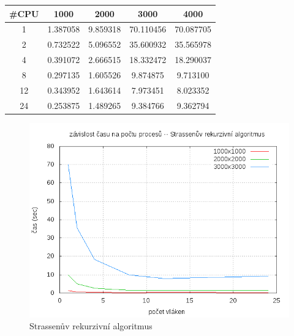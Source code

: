 \documentclass[12pt,a4paper]{article}
\begin{document}
\begin{center}
\begin{tabular}{ | c || c | c | c | c | }
\hline
\#CPU    &   1000		&	2000	&	3000	&	4000	\\
\hline
\hline
1    &   1.387058		&	9.859318 	&	70.110456  	& 70.087705  	\\ \hline
2    &   0.732522 		&	5.096552 	&	35.600932 	& 35.565978 	\\ \hline
4    &   0.391072 		&	2.666515 	&	18.332472 	& 18.290037 	 \\	 \hline
8    &   0.297135 		&	1.605526 	&	9.874875 	& 9.713100	\\	 \hline
12   &   0.343952 		&	1.643614  	&	7.973451	& 8.023352  	\\	 \hline
24   &   0.253875 		&	1.489265	&	9.384766	& 9.362794  	\\ \hline
\end{tabular}
\end{center}

\pagebreak
\begin{figure}[h]
\includegraphics[width=\textwidth]{graph/strassen.png}
\caption{Strassenův rekurzivní algoritmus}
\label{data4}
\end{figure}
\end{document}
